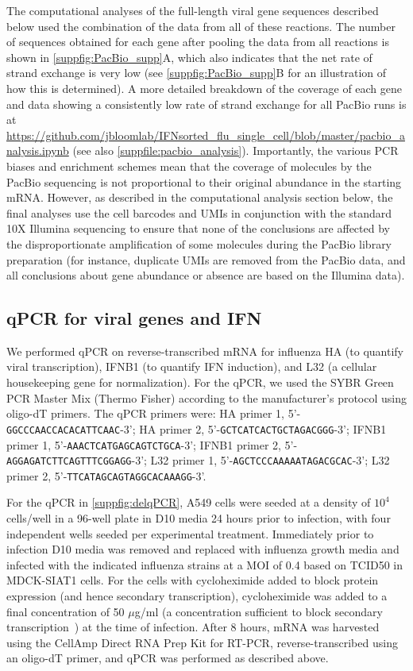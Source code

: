\documentclass[10pt,letterpaper]{article}
\newcommand{\SUPPFILE}[1]{\autoref{suppfile:#1}}
\newcommand{\SUPPFIG}[1]{\autoref{suppfig:#1}}
\begin{document}
The computational analyses of the full-length viral gene sequences described below used the combination of the data from all of these reactions.
The number of sequences obtained for each gene after pooling the data from all reactions is shown in \SUPPFIG{PacBio_supp}A, which also indicates that the net rate of strand exchange is very low (see \SUPPFIG{PacBio_supp}B for an illustration of how this is determined).
A more detailed breakdown of the coverage of each gene and data showing a consistently low rate of strand exchange for all PacBio runs is at \url{https://github.com/jbloomlab/IFNsorted_flu_single_cell/blob/master/pacbio_analysis.ipynb} (see also \SUPPFILE{pacbio_analysis}).
Importantly, the various PCR biases and enrichment schemes mean that the coverage of molecules by the PacBio sequencing is not proportional to their original abundance in the starting mRNA.
However, as described in the computational analysis section below, the final analyses use the cell barcodes and UMIs in conjunction with the standard 10X Illumina sequencing to ensure that none of the conclusions are affected by the disproportionate amplification of some molecules during the PacBio library preparation (for instance, duplicate UMIs are removed from the PacBio data, and all conclusions about gene abundance or absence are based on the Illumina data).

\subsection*{qPCR for viral genes and IFN}
We performed qPCR on reverse-transcribed mRNA for influenza HA (to quantify viral transcription), IFNB1 (to quantify IFN induction), and L32 (a cellular housekeeping gene for normalization).
For the qPCR, we used the SYBR Green PCR Master Mix (Thermo Fisher) according to the manufacturer's protocol using oligo-dT primers.
The qPCR primers were: HA primer 1, 5'-\texttt{GGCCCAACCACACATTCAAC}-3'; HA primer 2, 5'-\texttt{GCTCATCACTGCTAGACGGG}-3'; IFNB1 primer 1, 5'-\texttt{AAACTCATGAGCAGTCTGCA}-3'; IFNB1 primer 2, 5'-\texttt{AGGAGATCTTCAGTTTCGGAGG}-3'; L32 primer 1, 5'-\texttt{AGCTCCCAAAAATAGACGCAC}-3'; L32 primer 2, 5'-\texttt{TTCATAGCAGTAGGCACAAAGG}-3'. 

For the qPCR in \SUPPFIG{delqPCR}, A549 cells were seeded at a density of $10^4$ cells/well in a 96-well plate in D10 media 24 hours prior to infection, with four independent wells seeded per experimental treatment. 
Immediately prior to infection D10 media was removed and replaced with influenza growth media and infected with the indicated influenza strains at a MOI of 0.4 based on TCID50 in MDCK-SIAT1 cells.
For the cells with cycloheximide added to block protein expression (and hence secondary transcription), cycloheximide was added to a final concentration of 50 $\mu$g/ml (a concentration sufficient to block secondary transcription~\citep{killip2014activation}) at the time of infection.
After 8 hours, mRNA was harvested using the CellAmp Direct RNA Prep Kit for RT-PCR, reverse-transcribed using an oligo-dT primer, and qPCR was performed as described above.
\end{document}
